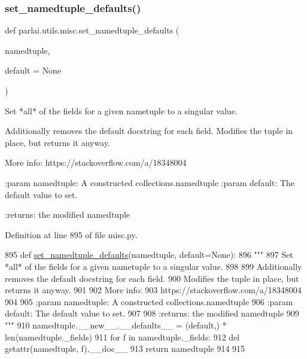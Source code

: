 \subsubsection{\texorpdfstring{set\+\_\+namedtuple\+\_\+defaults()}{set\_namedtuple\_defaults()}}
{\footnotesize\ttfamily def parlai.\+utils.\+misc.\+set\+\_\+namedtuple\+\_\+defaults (\begin{DoxyParamCaption}\item[{}]{namedtuple,  }\item[{}]{default = {\ttfamily None} }\end{DoxyParamCaption})}

\begin{DoxyVerb}Set *all* of the fields for a given nametuple to a singular value.

Additionally removes the default docstring for each field.
Modifies the tuple in place, but returns it anyway.

More info:
https://stackoverflow.com/a/18348004

:param namedtuple: A constructed collections.namedtuple
:param default: The default value to set.

:returns: the modified namedtuple
\end{DoxyVerb}
 

Definition at line 895 of file misc.\+py.


\begin{DoxyCode}
895 \textcolor{keyword}{def }\hyperlink{namespaceparlai_1_1utils_1_1misc_a8781cc03272b3a118fcd9e5a9f4ca1dd}{set\_namedtuple\_defaults}(namedtuple, default=None):
896     \textcolor{stringliteral}{"""}
897 \textcolor{stringliteral}{    Set *all* of the fields for a given nametuple to a singular value.}
898 \textcolor{stringliteral}{}
899 \textcolor{stringliteral}{    Additionally removes the default docstring for each field.}
900 \textcolor{stringliteral}{    Modifies the tuple in place, but returns it anyway.}
901 \textcolor{stringliteral}{}
902 \textcolor{stringliteral}{    More info:}
903 \textcolor{stringliteral}{    https://stackoverflow.com/a/18348004}
904 \textcolor{stringliteral}{}
905 \textcolor{stringliteral}{    :param namedtuple: A constructed collections.namedtuple}
906 \textcolor{stringliteral}{    :param default: The default value to set.}
907 \textcolor{stringliteral}{}
908 \textcolor{stringliteral}{    :returns: the modified namedtuple}
909 \textcolor{stringliteral}{    """}
910     namedtuple.\_\_new\_\_.\_\_defaults\_\_ = (default,) * len(namedtuple.\_fields)
911     \textcolor{keywordflow}{for} f \textcolor{keywordflow}{in} namedtuple.\_fields:
912         del getattr(namedtuple, f).\_\_doc\_\_
913     \textcolor{keywordflow}{return} namedtuple
914 
915 
\end{DoxyCode}
\mbox{\label{namespaceparlai_1_1utils_1_1misc_a1b053cd9c56e6fa79b058fff587b3a48}} 
